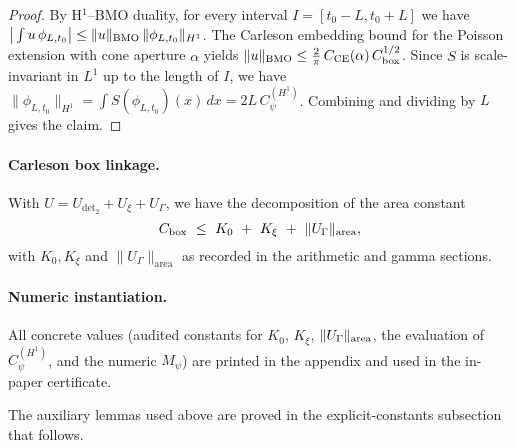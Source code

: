 \documentclass[11pt]{article}
\theoremstyle{definition}
\theoremstyle{remark}
\begin{document}
\begin{proof}
By H$^1$--BMO duality, for every interval $I=[t_0-L,t_0+L]$ we have
$\big|\int u\,\phi_{L,t_0}\big|\le \|u\|_{\rm BMO}\,\|\phi_{L,t_0}\|_{H^1}$.
The Carleson embedding bound for the Poisson extension with cone aperture $\alpha$ yields
$\|u\|_{\rm BMO}\le \tfrac{2}{\pi}\,C_{\mathrm{CE}}(\alpha)\,C_{\rm box}^{1/2}$. 
Since $S$ is scale-invariant in $L^1$ up to the length of $I$, we have 
$\|\phi_{L,t_0}\|_{H^1}=\int S(\phi_{L,t_0})(x)\,dx = 2L\,C_\psi^{(H^1)}$.
Combining and dividing by $L$ gives the claim.
\end{proof}

\paragraph{Carleson box linkage.}
With $U=U_{\det_2}+U_{\xi}+U_{\Gamma}$, we have the decomposition of the area constant
\[
  C_{\rm box}\ \le\ K_0\ +\ K_\xi\ +\ \|U_\Gamma\|_{\mathrm{area}},
\]
with $K_0, K_\xi$ and $\|U_\Gamma\|_{\mathrm{area}}$ as recorded in the arithmetic and gamma sections.

\paragraph{Numeric instantiation.}
All concrete values (audited constants for $K_0$, $K_\xi$, $\|U_\Gamma\|_{\rm area}$, the evaluation of $C_\psi^{(H^1)}$, and the numeric $M_\psi$) are printed in the appendix and used in the in-paper certificate.



The auxiliary lemmas used above are proved in the explicit-constants subsection that follows.
\end{document}
